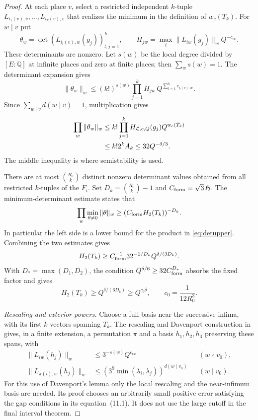 \documentclass[11pt]{article}
\numberwithin{equation}{section}
\theoremstyle{remark}\newtheorem{remark}[theorem]{Remark}
\newcommand{\Q}{\mathbb Q}\newcommand{\Z}{\mathbb Z}
\begin{document}
\begin{proof}
At each place $v$, select a restricted independent $k$-tuple
$L_{i_1(v),v},\ldots,L_{i_k(v),v}$ that realizes the minimum in the
definition of $w_c(T_k)$. For $w\mid v$ put
\[
 \theta_w=\det(L_{i_l(v),w}(g_j))_{l,j=1}^k,\qquad
 H_{jw}=\max_i\|L_{iw}(g_j)\|_wQ^{-c_{iw}}.
\]
These determinants are nonzero. Let $s(w)$ be the local degree divided
by $[E:\Q]$ at infinite places and zero at finite places; then
$\sum_ws(w)=1$. The determinant expansion gives
\[
 \|\theta_w\|_w\le(k!)^{s(w)}
 \prod_{j=1}^kH_{jw}\,Q^{\sum_{l=1}^kc_{i_l(v),w}}.
\]
Since $\sum_{w\mid v}d(w\mid v)=1$, multiplication gives
\begin{align}
 \prod_w\|\theta_w\|_w
 &\le k!\prod_{j=1}^kH_{\mathcal L,c,Q}(g_j)Q^{w_c(T_k)}\notag\\
 &\le k!2^kA_k\le32Q^{-\delta/3}.
 \label{eq:detupper}
\end{align}
The middle inequality is where semistability is used.

There are at most $\binom{R_0}k$ distinct nonzero determinant values
obtained from all restricted $k$-tuples of the $F_i$. Set
$D_k=\binom{R_0}k-1$ and $C_{\rm form}=\sqrt3\,\mathfrak H$.
The minimum-determinant estimate \cite[Lemma~10.2, equation~(10.2)]{EF13}
states that
\begin{equation}\label{eq:detlower}
 \prod_w\min_{\theta\ne0}\|\theta\|_w
 \ge(C_{\rm form}H_2(T_k))^{-D_k}.
\end{equation}
In particular the left side is a lower bound for the product in
\eqref{eq:detupper}. Combining the two estimates gives
\[
 H_2(T_k)\ge C_{\rm form}^{-1}32^{-1/D_k}
                 Q^{\delta/(3D_k)}.
\]
With $D_* =\max(D_1,D_2)$, the condition
$Q^{\delta/6}\ge32C_{\rm form}^{D_*}$ absorbs the fixed factor and gives
\begin{equation}\label{eq:infimumheight}
 H_2(T_k)\ge Q^{\delta/(6D_k)}\ge Q^{c_0\delta},
 \qquad c_0=\frac1{12R_0^3}.
\end{equation}

\emph{Rescaling and exterior powers.}
Choose a full basis near the successive infima, with its first $k$
vectors spanning $T_k$. The rescaling and Davenport construction in
\cite[Lemmas~11.1--11.3]{EF13} gives, in a finite extension, a
permutation $\pi$ and a basis $h_1,h_2,h_3$ preserving these spans, with
\begin{align}
 \|L_{iw}(h_j)\|_w
 &\le3^{-s(w)}Q^{c_{iw}} &&(w\nmid v_0),\label{eq:davenportordinary}\\
 \|L_{\pi(i),w}(h_j)\|_w
 &\le(3^9\min(\lambda_i,\lambda_j))^{d(w\mid v_0)}
       &&(w\mid v_0).\label{eq:davenportspecial}
\end{align}
For this use of Davenport's lemma only the local rescaling and the
near-infimum basis are needed. Its proof chooses an arbitrarily small
positive error satisfying the gap conditions in its equation~(11.1).
It does not use the large cutoff in the final interval theorem.


\end{proof}
\end{document}
